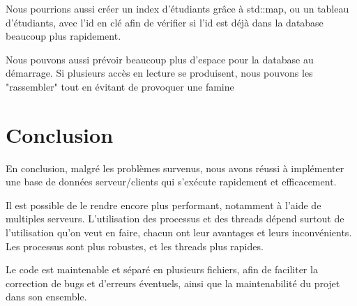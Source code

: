 \documentclass[utf8]{article}
\begin{document}
\begin{large}
Nous pourrions aussi créer un index d'étudiants grâce à std::map, ou un tableau
d'étudiants, avec l'id en clé afin de vérifier si l'id est déjà dans la database
beaucoup plus rapidement.

Nous pouvons aussi prévoir beaucoup plus d'espace pour la database au démarrage.
Si plusieurs accès en lecture se produisent, nous pouvons les "rassembler" tout
en évitant de provoquer une famine
\section{Conclusion}
\par
\indent
En conclusion, malgré les problèmes survenus, nous avons réussi à implémenter
une base de données serveur/clients qui s'exécute rapidement et
efficacement.
\par 
Il est possible de le rendre encore plus performant, notamment
à l'aide de multiples serveurs. L'utilisation des processus et des threads
dépend surtout de l'utilisation qu'on veut en faire, chacun ont leur avantages
et leurs inconvénients. Les processus sont plus robustes, et les threads plus rapides.

Le code est maintenable et séparé en plusieurs fichiers,
afin de faciliter la correction de bugs et d'erreurs éventuels, ainsi que la
maintenabilité du projet dans son ensemble.
\par

\end{large}
\end{document}
